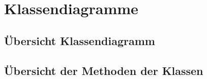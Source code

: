 \chapter{Klassendiagramme}

\section{Übersicht Klassendiagramm}

\section{Übersicht der Methoden der Klassen}